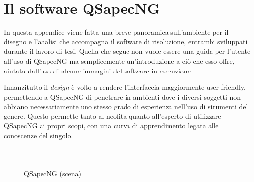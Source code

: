 \chapter{Il software QSapecNG}

In questa appendice viene fatta una breve panoramica sull'ambiente per il disegno e l'analisi che accompagna il software di risoluzione, entrambi sviluppati durante il lavoro di tesi. Quella che segue non vuole essere una guida per l'utente all'uso di QSapecNG ma semplicemente un'introduzione a ciò che esso offre, aiutata dall'uso di alcune immagini del software in esecuzione.

Innanzitutto il \textit{design} è volto a rendere l'interfaccia maggiormente user-friendly, permettendo a QSapecNG di penetrare in ambienti dove i diversi soggetti non abbiano necessariamente uno stesso grado di esperienza nell'uso di strumenti del genere. Questo permette tanto al neofita quanto all'esperto di utilizzare QSapecNG ai propri scopi, con una curva di apprendimento legata alle conoscenze del singolo.

\paragraph{}

\begin{figure}[hb]
 \centering
 \\
 \caption{QSapecNG (scena)}
 \label{fig:qsapecng-ss}
\end{figure}

